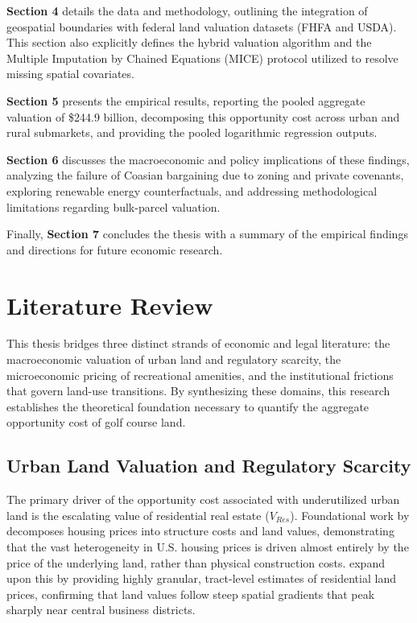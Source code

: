 \documentclass[10pt, letterpaper]{article}
\begin{document}
\textbf{Section 4} details the data and methodology, outlining the integration of geospatial boundaries with federal land valuation datasets (FHFA and USDA). This section also explicitly defines the hybrid valuation algorithm and the Multiple Imputation by Chained Equations (MICE) protocol utilized to resolve missing spatial covariates. 

\textbf{Section 5} presents the empirical results, reporting the pooled aggregate valuation of \$244.9 billion, decomposing this opportunity cost across urban and rural submarkets, and providing the pooled logarithmic regression outputs. 

\textbf{Section 6} discusses the macroeconomic and policy implications of these findings, analyzing the failure of Coasian bargaining due to zoning and private covenants, exploring renewable energy counterfactuals, and addressing methodological limitations regarding bulk-parcel valuation. 

Finally, \textbf{Section 7} concludes the thesis with a summary of the empirical findings and directions for future economic research.

\newpage

\section{Literature Review}


This thesis bridges three distinct strands of economic and legal literature: the macroeconomic valuation of urban land and regulatory scarcity, the microeconomic pricing of recreational amenities, and the institutional frictions that govern land-use transitions. By synthesizing these domains, this research establishes the theoretical foundation necessary to quantify the aggregate opportunity cost of golf course land.

\subsection{Urban Land Valuation and Regulatory Scarcity}
The primary driver of the opportunity cost associated with underutilized urban land is the escalating value of residential real estate ($V_{Res}$). Foundational work by \textcite{Davis2008} decomposes housing prices into structure costs and land values, demonstrating that the vast heterogeneity in U.S. housing prices is driven almost entirely by the price of the underlying land, rather than physical construction costs. \textcite{Davis2021} expand upon this by providing highly granular, tract-level estimates of residential land prices, confirming that land values follow steep spatial gradients that peak sharply near central business districts. 
\end{document}
